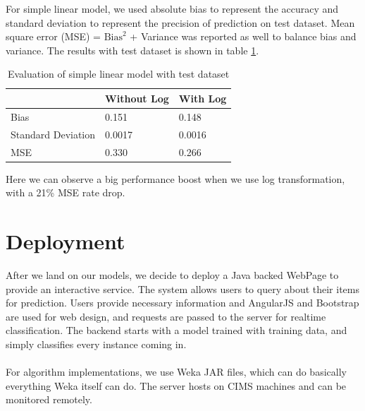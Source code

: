 \documentclass[CEJM,PDF]{cej} %
\begin{document}
For simple linear model, we used absolute bias to represent the accuracy and standard deviation to represent the precision of prediction on test dataset. Mean square error (MSE) = $\text{Bias}^2$ + Variance was reported as well to balance bias and variance. The results with test dataset is shown in table \ref{lm}.

\begin{table}[h]
\centering
\caption{Evaluation of simple linear model with test dataset}
\label{lm}
\begin{tabular}{@{}|l|l|l|@{}}
\toprule
\hline
  & Without Log & With Log \\
\hline
Bias  & 0.151  & 0.148 \\ \midrule
\hline
Standard Deviation  &  0.0017 & 0.0016  \\
\hline
MSE  &  0.330  & 0.266\\ \bottomrule
\hline
\end{tabular}
\end{table}

Here we can observe a big performance boost when we use log transformation, with a 21\% MSE rate drop.\\

\section{Deployment}
After we land on our models, we decide to deploy a Java backed WebPage to provide an interactive service. The system allows users to query about their items for prediction. Users provide necessary information and AngularJS and Bootstrap are used for web design, and requests are passed to the server for realtime classification. The backend starts with a model trained with training data, and simply classifies every instance coming in.\\
\\
For algorithm implementations, we use Weka JAR files, which can do basically everything Weka itself can do. The server hosts on CIMS machines and can be monitored remotely.\\
\end{document}
